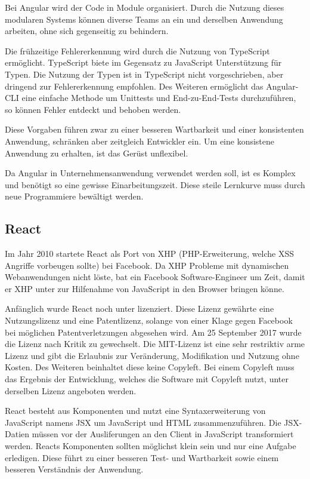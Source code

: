 Bei Angular wird der Code in Module organisiert. Durch die Nutzung dieses modularen Systems können diverse Teams an ein und derselben Anwendung arbeiten, ohne sich gegenseitig zu behindern.

Die frühzeitige Fehlererkennung wird durch die Nutzung von TypeScript ermöglicht. TypeScript biete im Gegensatz zu JavaScript Unterstützung für Typen. Die Nutzung der Typen ist in TypeScript nicht vorgeschrieben, aber dringend zur Fehlererkennung empfohlen.
Des Weiteren ermöglicht das Angular-CLI eine einfache Methode um Unittests und End-zu-End-Tests durchzuführen, so können Fehler entdeckt und behoben werden. \cite{wahlinWesentlichenVorteileAngular2017}

Diese Vorgaben führen zwar zu einer besseren Wartbarkeit und einer konsistenten Anwendung, schränken aber zeitgleich Entwickler ein. Um eine konsistene Anwendung zu erhalten, ist das Gerüst unflexibel.

Da Angular in Unternehmensanwendung verwendet werden soll, ist es Komplex und benötigt so eine gewisse Einarbeitungszeit. Diese steile Lernkurve muss durch neue Programmiere bewältigt werden.\cite{ventzkemediaAngularVsReact2018}

\subsection{React}
Im Jahr 2010 startete React als Port von XHP (PHP-Erweiterung, welche XSS Angriffe vorbeugen sollte) bei Facebook. Da XHP Probleme mit dynamischen Webanwendungen nicht löste, bat ein Facebook Software-Engineer um Zeit, damit er XHP unter zur Hilfenahme von JavaScript in den Browser bringen könne. \cite{dawsonJavaScriptHistoryHow2014}

Anfänglich wurde React noch unter  lizenziert. Diese Lizenz gewährte eine Nutzungslizenz und eine Patentlizenz, solange von einer Klage gegen Facebook bei möglichen Patentverletzungen abgesehen wird. Am 25 September 2017 wurde die Lizenz nach Kritik zu  gewechselt. \cite{kripalaniIfYouRe2017}\cite{larsonFacebookJustChanged2017} Die MIT-Lizenz ist eine sehr restriktiv arme Lizenz und gibt die Erlaubnis zur Veränderung, Modifikation und Nutzung ohne Kosten. Des Weiteren beinhaltet diese keine Copyleft. Bei einem Copyleft muss das Ergebnis der Entwicklung, welches die Software mit Copyleft nutzt, unter derselben Lizenz angeboten werden.\cite{wehnerSoftwareUnterMIT2020}

React besteht aus Komponenten und nutzt eine Syntaxerweiterung von JavaScript namens JSX um JavaScript und HTML zusammenzuführen. Die JSX-Datien müssen vor der Ausliferungen an den Client in JavaScript transformiert werden. Reacts Komponenten sollten möglichst klein sein und nur eine Aufgabe erledigen. Diese führt zu einer besseren Test- und Wartbarkeit sowie einem besseren Verständnis der Anwendung.

